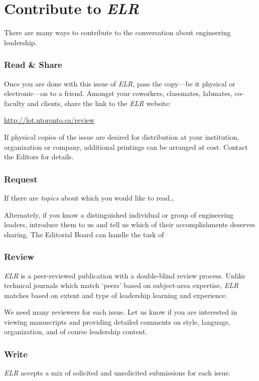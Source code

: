 \chapter*{Contribute to \emph{ELR}}
There are many ways to contribute to the conversation about engineering leadership.

\subsection{Read \& Share}
Once you are done with this issue of \emph{ELR}, pass the copy---be it physical or electronic---on to a friend.
Amongst your coworkers, classmates, labmates, co-faculty and clients, share the link to the \emph{ELR} website:
\begin{center}\url{http://lot.utoronto.ca/review}\end{center}

If physical copies of the issue are desired for distribution at your institution, organization or company, additional printings can be arranged at cost.
Contact the Editors for details.

\subsection{Request}
If there are \emph{topics} about which you would like to read\ldots

Alternately, if you know a distinguished individual or group of engineering leaders, introduce them to us and tell us which of their accomplishments deserves sharing.
The Editorial Board can handle the task of 

\subsection{Review}
\emph{ELR} is a peer-reviewed publication with a double-blind review process.
Unlike technical journals which match `peers' based on subject-area expertise, \emph{ELR} matches based on extent and type of leadership learning and experience.

We need many reviewers for each issue.
Let us know if you are interested in viewing manuscripts and providing detailed comments on style, language, organization, and of course leadership content.

\subsection{Write}
\emph{ELR} accepts a mix of solicited and unsolicited submissions for each issue.


